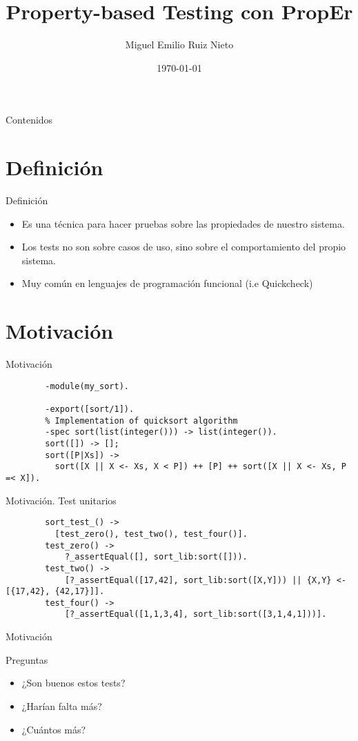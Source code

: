 \documentclass{beamer}
\title{Property-based Testing con PropEr}
\author{Miguel Emilio Ruiz Nieto}
\date{\today} %
\begin{document}
  \begin{frame}
    \titlepage
  \end{frame}

  \begin{frame}{Contenidos}
    \tableofcontents[hideallsubsections]
  \end{frame}

  \section{Definición}
    \begin{frame}{Definición}
      \begin{itemize}
        \item Es una técnica para hacer pruebas sobre las propiedades de nuestro sistema.
        \item Los tests no son sobre casos de uso, sino sobre el comportamiento del propio sistema.
        \item Muy común en lenguajes de programación funcional (i.e Quickcheck)
      \end{itemize}
    \end{frame}
  \section{Motivación}
    \begin{frame}[fragile]{Motivación}
      \begin{verbatim}
        -module(my_sort).

        -export([sort/1]).
        % Implementation of quicksort algorithm
        -spec sort(list(integer())) -> list(integer()).
        sort([]) -> [];
        sort([P|Xs]) ->
          sort([X || X <- Xs, X < P]) ++ [P] ++ sort([X || X <- Xs, P =< X]).
      \end{verbatim}
    \end{frame}
    \begin{frame}[fragile]{Motivación. Test unitarios}
      \begin{verbatim}
        sort_test_() ->
          [test_zero(), test_two(), test_four()].
        test_zero() ->
            ?_assertEqual([], sort_lib:sort([])).
        test_two() ->
            [?_assertEqual([17,42], sort_lib:sort([X,Y])) || {X,Y} <- [{17,42}, {42,17}]].
        test_four() ->
            [?_assertEqual([1,1,3,4], sort_lib:sort([3,1,4,1]))].
      \end{verbatim}
    \end{frame}
    \begin{frame}{Motivación}
      \begin{block}{Preguntas}
        \begin{itemize}
          \item ¿Son buenos estos tests?
          \item ¿Harían falta más?
          \item ¿Cuántos más?
        \end{itemize}
      \end{block}
    \end{frame}
\end{document}
